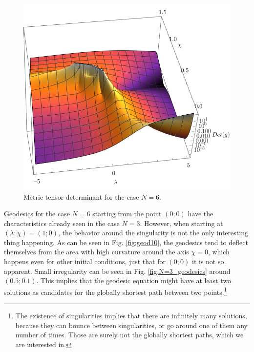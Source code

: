 \begin{figure}[H]
    \centering
    \includegraphics[scale=1.3]{../img/N=5_det3D.pdf}
    \caption{Metric tensor determinant for the case $N=6$.}
    \label{fig:N=6_det3D}    
\end{figure}



Geodesics for the case $N=6$ starting from the point $(0;0)$ have the characteristics already seen in the case $N=3$. However, when starting at $(\lambda;\chi)=(1;0)$, the behavior around the singularity is not the only interesting thing happening. As can be seen in Fig. \ref{fig:geod10}, the geodesics tend to deflect themselves from the area with high curvature around the axis $\chi=0$, which happens even for other initial conditions, just that for $(0;0)$ it is not so apparent. Small irregularity can be seen in Fig. \ref{fig:N=3_geodesics} around $(0.5;0.1)$. This implies that the geodesic equation might have at least two solutions as candidates for the globally shortest path between two points.\footnote{The existence of singularities implies that there are infinitely many solutions, because they can bounce between singularities, or go around one of them any number of times. Those are surely not the globally shortest paths, which we are interested in.} 



